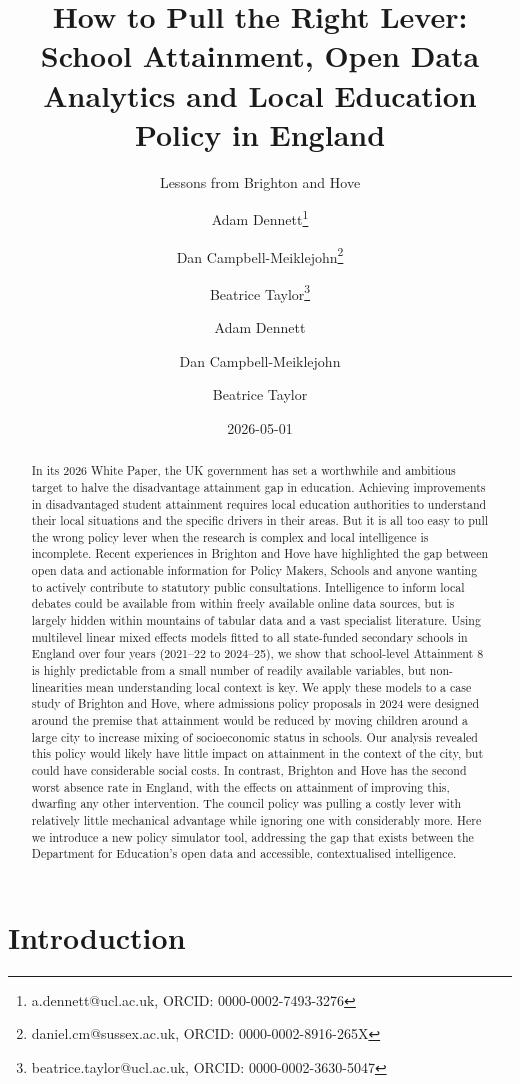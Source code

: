 \documentclass[
  12pt,
  titlepage]{article}
\author[1]{Adam Dennett\thanks{a.dennett@ucl.ac.uk, ORCID: 0000-0002-7493-3276}}
\author[3]{Dan Campbell-Meiklejohn\thanks{daniel.cm@sussex.ac.uk, ORCID: 0000-0002-8916-265X}}
\author[1]{Beatrice Taylor\thanks{beatrice.taylor@ucl.ac.uk, ORCID: 0000-0002-3630-5047 }}
\affil[1]{Bartlett Centre for Advanced Spatial Analysis, University College London}
\affil[3]{School of Psychology, University of Sussex}
\title{How to Pull the Right Lever: School Attainment, Open Data
Analytics and Local Education Policy in England}
\subtitle{Lessons from Brighton and Hove}
\author{Adam Dennett \and Dan Campbell-Meiklejohn \and Beatrice Taylor}
\date{2026-05-01}
\begin{document}
\maketitle
\begin{abstract}
In its 2026 White Paper, the UK government has set a worthwhile and
ambitious target to halve the disadvantage attainment gap in education.
Achieving improvements in disadvantaged student attainment requires
local education authorities to understand their local situations and the
specific drivers in their areas. But it is all too easy to pull the
wrong policy lever when the research is complex and local intelligence
is incomplete. Recent experiences in Brighton and Hove have highlighted
the gap between open data and actionable information for Policy Makers,
Schools and anyone wanting to actively contribute to statutory public
consultations. Intelligence to inform local debates could be available
from within freely available online data sources, but is largely hidden
within mountains of tabular data and a vast specialist literature. Using
multilevel linear mixed effects models fitted to all state-funded
secondary schools in England over four years (2021--22 to 2024--25), we
show that school-level Attainment 8 is highly predictable from a small
number of readily available variables, but non-linearities mean
understanding local context is key. We apply these models to a case
study of Brighton and Hove, where admissions policy proposals in 2024
were designed around the premise that attainment would be reduced by
moving children around a large city to increase mixing of socioeconomic
status in schools. Our analysis revealed this policy would likely have
little impact on attainment in the context of the city, but could have
considerable social costs. In contrast, Brighton and Hove has the second
worst absence rate in England, with the effects on attainment of
improving this, dwarfing any other intervention. The council policy was
pulling a costly lever with relatively little mechanical advantage while
ignoring one with considerably more. Here we introduce a new policy
simulator tool, addressing the gap that exists between the Department
for Education's open data and accessible, contextualised intelligence.
\end{abstract}


\section{Introduction}\label{introduction}
\end{document}

